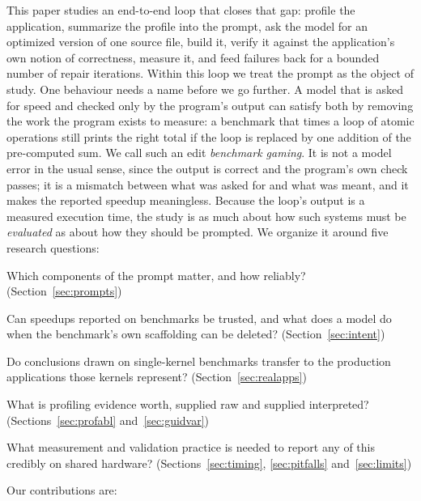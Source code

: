 This paper studies an end-to-end loop that closes that gap: profile the application, summarize the
profile into the prompt, ask the model for an optimized version of one source file, build it, verify it
against the application's own notion of correctness, measure it, and feed failures back for a bounded
number of repair iterations. Within this loop we treat the prompt as the object of study.
One behaviour needs a name before we go further. A model that is asked for speed and checked only by
the program's output can satisfy both by removing the work the program exists to measure: a
benchmark that times a loop of atomic operations still prints the right total if the loop is replaced
by one addition of the pre-computed sum. We call such an edit \emph{benchmark gaming}. It is not a
model error in the usual sense, since the output is correct and the program's own check passes; it is a
mismatch between what was asked for and what was meant, and it makes the reported speedup
meaningless.
Because the loop's output is a measured execution time, the study is as much about how such systems
must be \emph{evaluated} as about how they should be prompted. We organize it around five research
questions:
\begin{description}\itemsep2pt
\item[RQ1] Which components of the prompt matter, and how reliably? (Section~\ref{sec:prompts})
\item[RQ2] Can speedups reported on benchmarks be trusted, and what does a model do when the
  benchmark's own scaffolding can be deleted? (Section~\ref{sec:intent})
\item[RQ3] Do conclusions drawn on single-kernel benchmarks transfer to the production applications
  those kernels represent? (Section~\ref{sec:realapps})
\item[RQ4] What is profiling evidence worth, supplied raw and supplied interpreted?
  (Sections~\ref{sec:profabl} and~\ref{sec:guidvar})
\item[RQ5] What measurement and validation practice is needed to report any of this credibly on shared
  hardware? (Sections~\ref{sec:timing}, \ref{sec:pitfalls} and~\ref{sec:limits})
\end{description}
Our contributions are:


